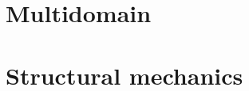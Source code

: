 

\graphicspath{
{images/png/}{images/}{images/plots/}
}




\setcounter{tocdepth}{2}
\tableofcontents
\newpage






\section{Multidomain}

\section{Structural mechanics}


\newpage
{}


%


